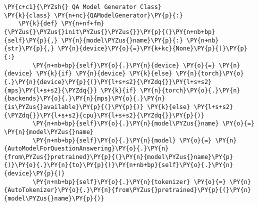 \documentclass[11pt]{wseas}
\begin{document}
\begin{tcolorbox}[breakable, size=fbox, boxrule=1pt, pad at break*=1mm,colback=cellbackground, colframe=cellborder]
\begin{Verbatim}[commandchars=\\\{\}]
\PY{c+c1}{\PYZsh{} QA Model Generator Class}
\PY{k}{class} \PY{n+nc}{QAModelGenerator}\PY{p}{:}
    \PY{k}{def} \PY{n+nf+fm}{\PYZus{}\PYZus{}init\PYZus{}\PYZus{}}\PY{p}{(}\PY{n+nb+bp}{self}\PY{p}{,} \PY{n}{model\PYZus{}name}\PY{p}{:} \PY{n+nb}{str}\PY{p}{,} \PY{n}{device}\PY{o}{=}\PY{k+kc}{None}\PY{p}{)}\PY{p}{:}
        \PY{n+nb+bp}{self}\PY{o}{.}\PY{n}{device} \PY{o}{=} \PY{n}{device} \PY{k}{if} \PY{n}{device} \PY{k}{else} \PY{n}{torch}\PY{o}{.}\PY{n}{device}\PY{p}{(}\PY{l+s+s2}{\PYZdq{}}\PY{l+s+s2}{mps}\PY{l+s+s2}{\PYZdq{}} \PY{k}{if} \PY{n}{torch}\PY{o}{.}\PY{n}{backends}\PY{o}{.}\PY{n}{mps}\PY{o}{.}\PY{n}{is\PYZus{}available}\PY{p}{(}\PY{p}{)} \PY{k}{else} \PY{l+s+s2}{\PYZdq{}}\PY{l+s+s2}{cpu}\PY{l+s+s2}{\PYZdq{}}\PY{p}{)}
        \PY{n+nb+bp}{self}\PY{o}{.}\PY{n}{model\PYZus{}name} \PY{o}{=} \PY{n}{model\PYZus{}name}
        \PY{n+nb+bp}{self}\PY{o}{.}\PY{n}{model} \PY{o}{=} \PY{n}{AutoModelForQuestionAnswering}\PY{o}{.}\PY{n}{from\PYZus{}pretrained}\PY{p}{(}\PY{n}{model\PYZus{}name}\PY{p}{)}\PY{o}{.}\PY{n}{to}\PY{p}{(}\PY{n+nb+bp}{self}\PY{o}{.}\PY{n}{device}\PY{p}{)}
        \PY{n+nb+bp}{self}\PY{o}{.}\PY{n}{tokenizer} \PY{o}{=} \PY{n}{AutoTokenizer}\PY{o}{.}\PY{n}{from\PYZus{}pretrained}\PY{p}{(}\PY{n}{model\PYZus{}name}\PY{p}{)}


\end{Verbatim}
\end{tcolorbox}
\end{document}
